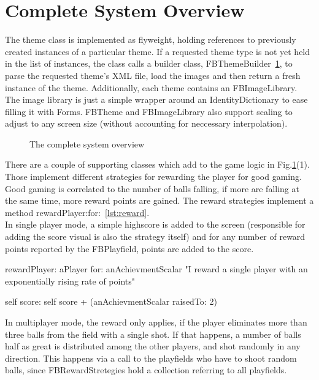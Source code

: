 \section{Complete System Overview}
%
The theme class is implemented as flyweight, holding references to previously 
created instances of a particular theme. If a requested theme type is not yet 
held in the list of instances, the class calls a builder class, 
FBThemeBuilder~\ref{fig:system}, to parse the requested theme's XML file, 
load the images and then return a fresh instance of the theme. Additionally, 
each theme contains an FBImageLibrary. The image library is just a simple 
wrapper around an IdentityDictionary to ease filling it with Forms. 
FBTheme and FBImageLibrary also support scaling to adjust to any screen 
size (without accounting for neccessary interpolation).
%
\begin{figure}[bt]
  \begin{center}
  \end{center}
  \caption{The complete system overview}
  \label{fig:system}
\end{figure}
%
There are a couple of supporting classes which add to the game logic 
in Fig.\ref{fig:system}(1). Those implement different strategies for 
rewarding the player for good gaming. Good gaming is correlated to the 
number of balls falling, if more are falling at the same time, more 
reward points are gained.
The reward strategies implement a method
rewardPlayer:for:~\ref{lst:reward}.\\
In single player mode, a
simple highscore is added to the screen (responsible for adding the 
score visual is also the strategy itself) and for any number of 
reward points reported by the FBPlayfield, points are added to the 
score. 
%
\begin{listing}[bt]
rewardPlayer: aPlayer for: anAchievmentScalar
    "I reward a single player with an exponentially 
rising rate of points" 
    
    self score:
        self score + (anAchievmentScalar raisedTo: 2)
\end{listing}
%
In multiplayer mode, the reward only applies, if the player eliminates 
more than three balls from the field with a single shot. If that happens, 
a number of balls half as great is distributed among the other players,
and shot randomly in any direction. This happens via a call to 
the playfields who have to shoot random balls, since FBRewardStretegies
hold a collection referring to all playfields.

